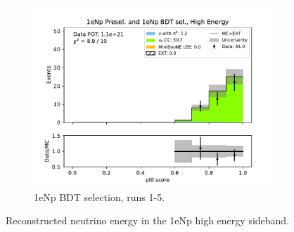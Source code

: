 \begin{figure}[H]
\begin{subfigure}{0.33\linewidth}
    \includegraphics[width=\linewidth]{technote/Sidebands/Figures/FarSideband/far_sideband_pi0_score_run1234b4c4d5_NP_NPBDT_HIGH_ENERGY.pdf}
    \caption{1eNp BDT selection, runs 1-5.}
    \end{subfigure}
    \caption{Reconstructed neutrino energy in the 1eNp high energy sideband.}
    \label{fig:HighEnergy1eNp_pi0_score}
\end{figure}

